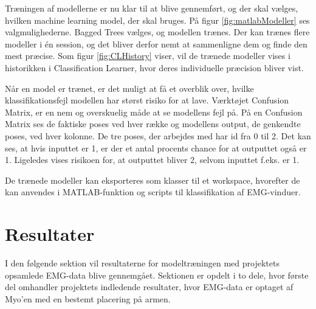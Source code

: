 
Træningen af modellerne er nu klar til at blive gennemført, og der skal vælges, hvilken machine learning model, der skal bruges. På figur \ref{fig:matlabModeller} ses valgmulighederne.
Bagged Trees vælges, og modellen trænes.
Der kan trænes flere modeller i én session, og det bliver derfor nemt at sammenligne dem og finde den mest præcise. Som figur \ref{fig:CLHistory} viser, vil de trænede modeller vises i historikken i Classification Learner, hvor deres individuelle præcision bliver vist.

Når en model er trænet, er det muligt at få et overblik over, hvilke klassifikationsfejl modellen har størst risiko for at lave. Værktøjet Confusion Matrix, er en nem og overskuelig måde at se modellens fejl på. På en Confusion Matrix ses de faktiske poses ved hver række og modellens output, de genkendte poses, ved hver kolonne. De tre poses, der arbejdes med har id fra 0 til 2. Det kan ses, at hvis inputtet er 1, er der et antal procents chance for at outputtet også er 1. Ligeledes vises risikoen for, at outputtet bliver 2, selvom inputtet f.eks. er 1.


De trænede modeller kan eksporteres som klasser til et workspace, hvorefter de kan anvendes i MATLAB-funktion og scripts til klassifikation af EMG-vinduer.

\section{Resultater}	
I den følgende sektion vil resultaterne for modeltræningen med projektets opsamlede EMG-data blive gennemgået. Sektionen er opdelt i to dele, hvor første del omhandler projektets indledende resultater, hvor EMG-data er optaget af Myo'en med en bestemt placering på armen.

